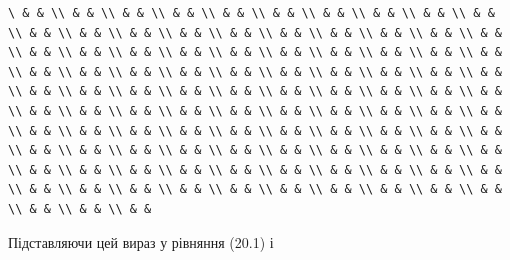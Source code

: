 \documentclass[
  ukrainian,
]{article}
\begin{document}
\begin{verbatim}
\ & & \\ & & \\ & & \\ & & \\ & & \\ & & \\ & & \\ & & \\ & & \\ & & \\ & & \\ & & \\ & & \\ & & \\ & & \\ & & \\ & & \\ & & \\ & & \\ & & \\ & & \\ & & \\ & & \\ & & \\ & & \\ & & \\ & & \\ & & \\ & & \\ & & \\ & & \\ & & \\ & & \\ & & \\ & & \\ & & \\ & & \\ & & \\ & & \\ & & \\ & & \\ & & \\ & & \\ & & \\ & & \\ & & \\ & & \\ & & \\ & & \\ & & \\ & & \\ & & \\ & & \\ & & \\ & & \\ & & \\ & & \\ & & \\ & & \\ & & \\ & & \\ & & \\ & & \\ & & \\ & & \\ & & \\ & & \\ & & \\ & & \\ & & \\ & & \\ & & \\ & & \\ & & \\ & & \\ & & \\ & & \\ & & \\ & & \\ & & \\ & & \\ & & \\ & & \\ & & \\ & & \\ & & \\ & & \\ & & \\ & & \\ & & \\ & & \\ & & \\ & & \\ & & \\ & & \\ & & \\ & & \\ & & \\ & & \\ & & \\ & & \\ & & \\ & &
\end{verbatim}

Підставляючи цей вираз у рівняння (20.1) і 
\end{document}

